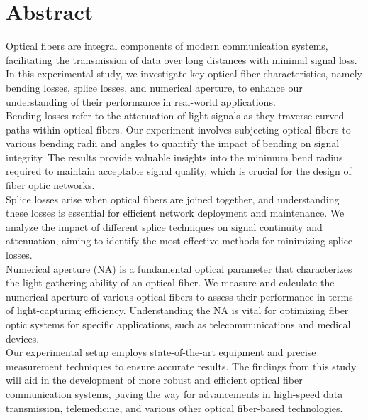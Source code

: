 
\chapter*{Abstract}%
%
%
%


Optical fibers are integral components of modern communication systems, facilitating the transmission of data over long distances with minimal signal loss. In this experimental study, we investigate key optical fiber characteristics, namely bending losses, splice losses, and numerical aperture, to enhance our understanding of their performance in real-world applications.\\

Bending losses refer to the attenuation of light signals as they traverse curved paths within optical fibers. Our experiment involves subjecting optical fibers to various bending radii and angles to quantify the impact of bending on signal integrity. The results provide valuable insights into the minimum bend radius required to maintain acceptable signal quality, which is crucial for the design of fiber optic networks.\\

Splice losses arise when optical fibers are joined together, and understanding these losses is essential for efficient network deployment and maintenance. We analyze the impact of different splice techniques on signal continuity and attenuation, aiming to identify the most effective methods for minimizing splice losses.\\

Numerical aperture (NA) is a fundamental optical parameter that characterizes the light-gathering ability of an optical fiber. We measure and calculate the numerical aperture of various optical fibers to assess their performance in terms of light-capturing efficiency. Understanding the NA is vital for optimizing fiber optic systems for specific applications, such as telecommunications and medical devices.\\

Our experimental setup employs state-of-the-art equipment and precise measurement techniques to ensure accurate results. The findings from this study will aid in the development of more robust and efficient optical fiber communication systems, paving the way for advancements in high-speed data transmission, telemedicine, and various other optical fiber-based technologies.\\

\medskip


